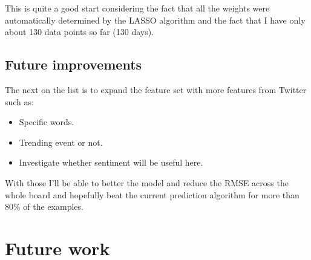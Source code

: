 \documentclass[minf,frontabs,twoside,singlespacing,parskip]{infthesis}
\begin{document}
This is quite a good start considering the fact that all the weights were automatically determined by the LASSO algorithm and the fact that I have only about 130 data points so far (130 days).

\section{Future improvements}

The next on the list is to expand the feature set with more features from Twitter such as:


\begin{itemize}
\item Specific words.
\item Trending event or not.
\item Investigate whether sentiment will be useful here.
\end{itemize}

With those I'll be able to better the model and reduce the RMSE across the whole board and hopefully beat the current prediction algorithm for more than 80\% of the examples.


\chapter{Future work}
\label{chap:future-work}



\end{document}
